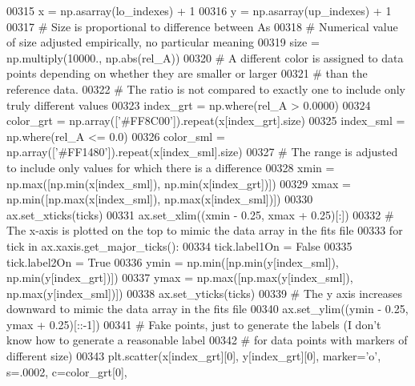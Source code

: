 \begin{DoxyCode}
00315                     x = np.asarray(lo\_indexes) + 1
00316                     y = np.asarray(up\_indexes) + 1
00317                     \textcolor{comment}{# Size is proportional to difference between As}
00318                     \textcolor{comment}{# Numerical value of size adjusted empirically, no particular meaning }
00319                     size = np.multiply(10000., np.abs(rel\_A))
00320                     \textcolor{comment}{# A different color is assigned to data points depending on whether they are smaller or
       larger}
00321                     \textcolor{comment}{# than the reference data.}
00322                     \textcolor{comment}{# The ratio is not compared to exactly one to include only truly different values  }
00323                     index\_grt = np.where(rel\_A > 0.0000)
00324                     color\_grt = np.array([\textcolor{stringliteral}{'#FF8C00'}]).repeat(x[index\_grt].size)
00325                     index\_sml = np.where(rel\_A <= 0.0)
00326                     color\_sml = np.array([\textcolor{stringliteral}{'#FF1480'}]).repeat(x[index\_sml].size)
00327                     \textcolor{comment}{# The range is adjusted to include only values for which there is a difference}
00328                     xmin = np.max([np.min(x[index\_sml]), np.min(x[index\_grt])])
00329                     xmax = np.min([np.max(x[index\_sml]), np.max(x[index\_sml])])
00330                     ax.set\_xticks(ticks)
00331                     ax.set\_xlim((xmin - 0.25, xmax + 0.25)[:])
00332                     \textcolor{comment}{# The x-axis is plotted on the top to mimic the data array in the fits file}
00333                     \textcolor{keywordflow}{for} tick \textcolor{keywordflow}{in} ax.xaxis.get\_major\_ticks():
00334                         tick.label1On = \textcolor{keyword}{False}
00335                         tick.label2On = \textcolor{keyword}{True}
00336                     ymin = np.min([np.min(y[index\_sml]), np.min(y[index\_grt])])
00337                     ymax = np.max([np.max(y[index\_sml]), np.max(y[index\_sml])])
00338                     ax.set\_yticks(ticks)
00339                     \textcolor{comment}{# The y axis increases downward to mimic the data array in the fits file}
00340                     ax.set\_ylim((ymin - 0.25, ymax + 0.25)[::-1])
00341                     \textcolor{comment}{# Fake points, just to generate the labels (I don't know how to generate a reasonable
       label}
00342                     \textcolor{comment}{# for data points with markers of different size)}
00343                     plt.scatter(x[index\_grt][0], y[index\_grt][0], marker=\textcolor{stringliteral}{'o'}, s=.0002, c=color\_grt[0],

\end{DoxyCode}

